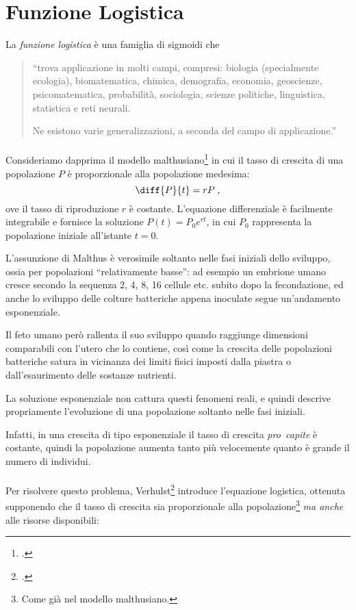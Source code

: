\section{Funzione Logistica}
\label{sec:logistic}
La \emph{funzione logistica} è una famiglia di sigmoidi che
\blockquote[\cite{WENlogistic}]{``\omissis trova applicazione in molti campi,
compresi: biologia (specialmente ecologia), biomatematica, chimica, demografia, economia,
geoscienze, psicomatematica, probabilità, sociologia, scienze politiche, linguistica,
statistica e reti neurali.

Ne esistono varie generalizzazioni, a seconda del campo di applicazione.''}

\paragraph{}
Consideriamo dapprima il modello malthusiano\footcite{malthus1986essay} in cui il tasso di crescita di una popolazione $P$
è proporzionale alla popolazione medesima:
$$\diff{P}{t} = rP \; , $$
ove il tasso di riproduzione $r$ è costante. L'equazione differenziale è facilmente integrabile e fornisce la soluzione
$P(t) = P_0 e^{rt}$, in cui $P_0$ rappresenta la popolazione iniziale all'istante $t=0$.

L'assunzione di Malthus è verosimile soltanto nelle fasi iniziali dello sviluppo, ossia
per popolazioni ``relativamente basse'': ad esempio un embrione umano cresce secondo la sequenza
2, 4, 8, 16 cellule etc. subito dopo la fecondazione, ed anche lo sviluppo delle colture batteriche appena inoculate
segue un'andamento esponenziale.

Il feto umano però rallenta il suo sviluppo quando raggiunge dimensioni comparabili con l'utero che lo contiene, così
come la crescita delle popolazioni batteriche satura in vicinanza dei limiti fisici imposti dalla piastra o dall'esaurimento
delle sostanze nutrienti.

La soluzione esponenziale non cattura questi fenomeni reali, e quindi descrive propriamente l'evoluzione di una popolazione soltanto nelle fasi iniziali.

Infatti, in una crescita di tipo esponenziale il tasso di crescita \emph{pro~capite} è costante, quindi la popolazione
aumenta tanto più velocemente quanto è grande il numero di individui.

\paragraph{}
Per risolvere questo problema, Verhulst\footcite{verhulst} introduce l'equazione logistica,
ottenuta supponendo che il tasso di crescita sia proporzionale alla popolazione\footnote{Come già nel modello malthusiano.}
\emph{ma anche} alle risorse disponibili:


